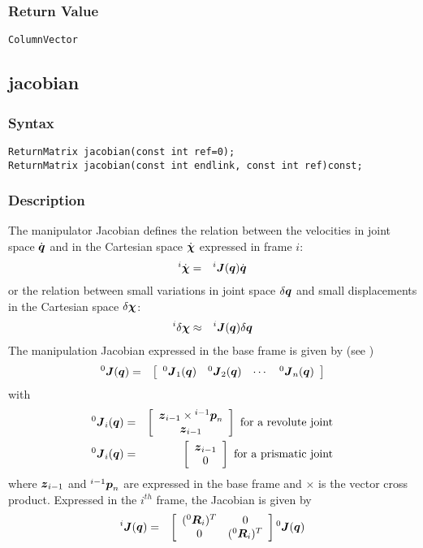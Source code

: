 \documentclass[11pt,fleqn,letterpaper]{report}
\newcommand{\mbold}[1]{\mbox{\boldmath $ #1 $}}
\newcommand{\matr}[2]{\left[\begin{array}{#1} #2 \end{array}\right]}
\begin{document}
\subsubsection*{Return Value}

{\tt ColumnVector}

\newpage

\subsection*{jacobian}
\subsubsection*{Syntax}
\begin{verbatim}
ReturnMatrix jacobian(const int ref=0);
ReturnMatrix jacobian(const int endlink, const int ref)const;
\end{verbatim}
\subsubsection*{Description}
The manipulator Jacobian defines the relation between the velocities in joint space 
$\dot{\mbold{q}}$ and in the Cartesian space $\dot{\mbold{\chi}}$ expressed in frame $i$:
\begin{eqnarray}
{}^i \dot{\mbold{\chi}} & = & {}^i \mbold{J}(\mbold{q}) \dot{\mbold{q}}
\end{eqnarray}
or the relation between small variations in joint space 
$\delta \mbold{q}$ and small displacements in the Cartesian space $\delta \mbold{\chi}$:
\begin{eqnarray}
{}^i \delta \mbold{\chi} & \approx & {}^i \mbold{J}(\mbold{q}) \delta \mbold{q}
\end{eqnarray}
The manipulation Jacobian expressed in the base frame is given by 
(see \cite{Fu87})
\begin{eqnarray}
{}^0 \mbold{J}(\mbold{q}) & = & \matr{cccc}{
{}^0 \mbold{J}_1(\mbold{q}) & {}^0 \mbold{J}_2(\mbold{q}) & \cdots & {}^0 \mbold{J}_n(\mbold{q})}
\end{eqnarray}
with
\begin{eqnarray}
  {}^0 \mbold{J}_i(\mbold{q}) & = & 
  \matr{c}{ \mbold{z}_{i-1} \times {}^{i-1} \mbold{p}_n \\ \mbold{z}_{i-1}} 
  \mbox{ for a revolute joint} \\
  {}^0 \mbold{J}_i(\mbold{q}) & = & 
  \matr{c}{ \mbold{z}_{i-1} \\ 0} \mbox{ for a prismatic joint} 
\end{eqnarray}
where $\mbold{z}_{i-1}$ and ${}^{i-1} \mbold{p}_n$ are expressed in
the base frame and $\times$ is the vector cross product.  Expressed in
the $i^{th}$ frame, the Jacobian is given by
\begin{eqnarray}
{}^i \mbold{J}(\mbold{q}) & = &
\matr{cc}{
({}^0 \mbold{R}_i)^T & 0 \\ 0 & ({}^0 \mbold{R}_i)^T 
} {}^0 \mbold{J}(\mbold{q})
\end{eqnarray}
\end{document}
